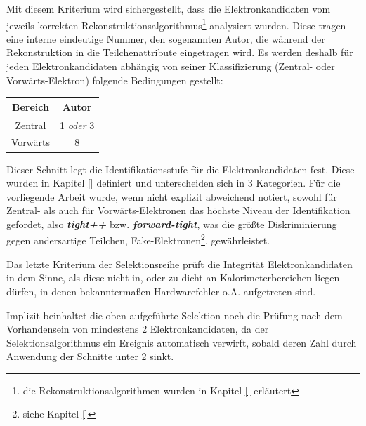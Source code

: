 \begin{description}
        Mit diesem Kriterium wird sichergestellt, dass die Elektronkandidaten
        vom jeweils korrekten Rekonstruktionsalgorithmus\footnote{die
        Rekonstruktionsalgorithmen wurden in Kapitel \ref{}
        erläutert} analysiert wurden. Diese tragen eine interne eindeutige
        Nummer, den sogenannten Autor, die während der Rekonstruktion in die
        Teilchenattribute eingetragen wird. Es werden deshalb für jeden
        Elektronkandidaten abhängig von seiner Klassifizierung (Zentral- oder
        Vorwärts-Elektron) folgende Bedingungen gestellt:
        \begin{table}[h!]
            \centering
            \begin{tabular}{|c|c|}
                \hline
                \bf{Bereich} & \bf{Autor} \\
                \hline \hline
                Zentral  & 1 \textit{oder} 3 \\
                Vorwärts & 8                 \\
                \hline
            \end{tabular}
        \end{table}

        Dieser Schnitt legt die Identifikationsstufe für die Elektronkandidaten
        fest. Diese wurden in Kapitel \ref{} definiert und unterscheiden sich
        in 3 Kategorien. Für die vorliegende Arbeit wurde, wenn nicht explizit
        abweichend notiert, sowohl für Zentral- als auch für
        Vorwärts-Elektronen das höchste Niveau der Identifikation gefordet,
        also \textbf{\textit{tight++}} bzw. \textbf{\textit{forward-tight}},
        was die größte Diskriminierung gegen andersartige Teilchen,
        Fake-Elektronen\footnote{siehe Kapitel \ref{}}, gewährleistet.

        Das letzte Kriterium der Selektionsreihe prüft die Integrität
        Elektronkandidaten in dem Sinne, als diese nicht in, oder zu dicht an
        Kalorimeterbereichen liegen dürfen, in denen bekanntermaßen
        Hardwarefehler o.Ä. aufgetreten sind.
\end{description}
Implizit beinhaltet die oben aufgeführte Selektion noch die Prüfung nach dem
Vorhandensein von mindestens 2 Elektronkandidaten, da der Selektionsalgorithmus
ein Ereignis automatisch verwirft, sobald deren Zahl durch Anwendung der
Schnitte unter 2 sinkt.

